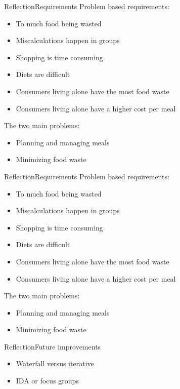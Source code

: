 \begin{frame}{Reflection}{Requirements}%
	Problem based requirements:
	\begin{itemize}
		\item To much food being wasted
		\item Miscalculations happen in groups
		\item Shopping is time consuming
		\item Diets are difficult
		\item Consumers living alone have the most food waste
		\item Consumers living alone have a higher cost per meal
	\end{itemize}
	The two main problems:
	\begin{itemize}
		\item Planning and managing meals
		\item Minimizing food waste
	\end{itemize}
\end{frame}
\begin{frame}{Reflection}{Requirements}%
	Problem based requirements:
	\begin{itemize}
		\item {\color{dkgreen}To much food being wasted}
		\item {\color{red}Miscalculations happen in groups}
		\item {\color{orange}Shopping is time consuming}
		\item {\color{dkgreen}Diets are difficult}
		\item {\color{red}Consumers living alone have the most food waste}
		\item {\color{red}Consumers living alone have a higher cost per meal}
	\end{itemize}
	The two main problems:
	\begin{itemize} \color{dkgreen}
		\item Planning and managing meals
		\item Minimizing food waste
	\end{itemize}
\end{frame}

\begin{frame}{Reflection}{Future improvements}
	\begin{itemize}
		\item Waterfall versus iterative
		\item IDA or focus groups
	\end{itemize}
\end{frame}

